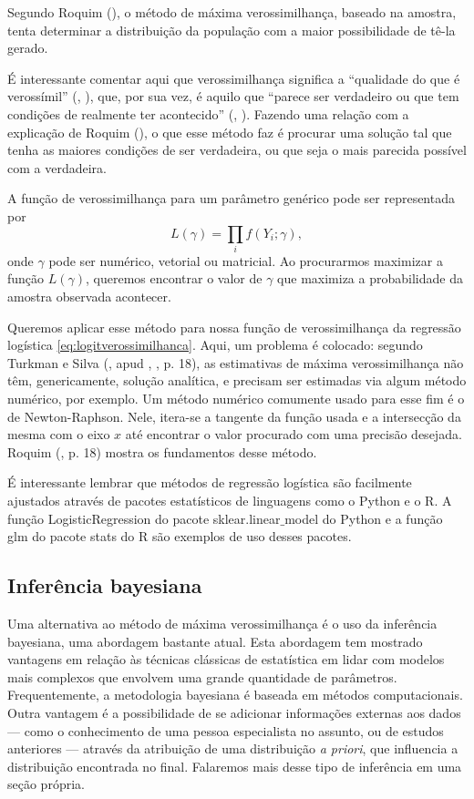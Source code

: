 \documentclass[
	12pt,				%
	openright,			%
	twoside,			%
	a4paper,			%
	english,			%
	brazil				%
	]{abntex2}
\begin{document}
 Segundo Roquim (\citeyear{roquim2014}), o método de máxima verossimilhança, baseado na amostra, tenta determinar a distribuição da população com a maior possibilidade de tê-la gerado.
 
 É interessante comentar aqui que verossimilhança significa a ``qualidade do que é verossímil'' (, \citeyear{verossimilhanca}), que, por sua vez, é aquilo que ``parece ser verdadeiro ou que tem condições de realmente ter acontecido'' (, \citeyear{verossimil}). Fazendo uma relação com a explicação de Roquim (\citeyear{roquim2014}), o que esse método faz é procurar uma solução tal que tenha as maiores condições de ser verdadeira, ou que seja o mais parecida possível com a verdadeira.

 A função de verossimilhança para um parâmetro genérico pode ser representada por
  \begin{equation}
    L(\gamma) = \prod_{i}{f(Y_{i}; \gamma)}, \label{eq:maxverossimilhanca}
  \end{equation}
  onde $\gamma$ pode ser numérico, vetorial ou matricial. Ao procurarmos maximizar a função $L(\gamma)$, queremos encontrar o valor de $\gamma$ que maximiza a probabilidade da amostra observada acontecer.
  
  Queremos aplicar esse método para nossa função de verossimilhança da regressão logística \eqref{eq:logitverossimilhanca}. Aqui, um problema é colocado: segundo Turkman e Silva (\citeyear{turk2000}, apud , \citeyear{roquim2014}, p. 18), as estimativas de máxima verossimilhança não têm, genericamente, solução analítica, e precisam ser estimadas via algum método numérico, por exemplo. Um método numérico comumente usado para esse fim é o de Newton-Raphson. Nele, itera-se a tangente da função usada e a intersecção da mesma com o eixo $x$ até encontrar o valor procurado com uma precisão desejada. Roquim (\citeyear{roquim2014}, p. 18) mostra os fundamentos desse método.
  
  É interessante lembrar que métodos de regressão logística são facilmente ajustados através de pacotes estatísticos de linguagens como o Python e o R. A função LogisticRegression do pacote sklear.linear$\_$model do Python e a função glm do pacote stats do R são exemplos de uso desses pacotes.
  
  \subsection{Inferência bayesiana}
  Uma alternativa ao método de máxima verossimilhança é o uso da inferência bayesiana, uma abordagem bastante atual. Esta abordagem tem mostrado vantagens em relação às técnicas clássicas de estatística em lidar com modelos mais complexos que envolvem uma grande quantidade de parâmetros. Frequentemente, a metodologia bayesiana é baseada em métodos computacionais. Outra vantagem é a possibilidade de se adicionar informações externas aos dados --- como o conhecimento de uma pessoa especialista no assunto, ou de estudos anteriores --- através da atribuição de uma distribuição \emph{a priori}, que influencia a distribuição encontrada no final. Falaremos mais desse tipo de inferência em uma seção própria.
\end{document}
